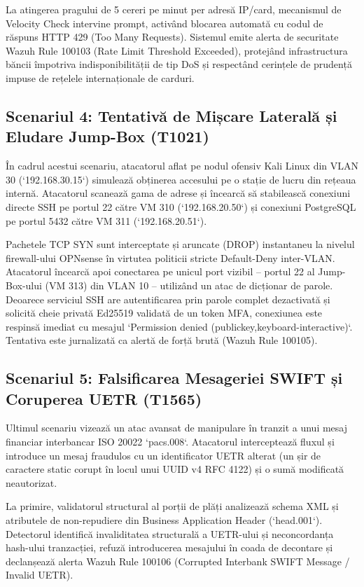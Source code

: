 La atingerea pragului de 5 cereri pe minut per adresă IP/card, mecanismul de Velocity Check intervine prompt, activând blocarea automată cu codul de răspuns HTTP 429 (Too Many Requests). Sistemul emite alerta de securitate Wazuh Rule 100103 (Rate Limit Threshold Exceeded), protejând infrastructura băncii împotriva indisponibilității de tip DoS și respectând cerințele de prudență impuse de rețelele internaționale de carduri.

\subsection{Scenariul 4: Tentativă de Mișcare Laterală și Eludare Jump-Box (T1021)}

În cadrul acestui scenariu, atacatorul aflat pe nodul ofensiv Kali Linux din VLAN 30 (`192.168.30.15`) simulează obținerea accesului pe o stație de lucru din rețeaua internă. Atacatorul scanează gama de adrese și încearcă să stabilească conexiuni directe SSH pe portul 22 către VM 310 (`192.168.20.50`) și conexiuni PostgreSQL pe portul 5432 către VM 311 (`192.168.20.51`).

Pachetele TCP SYN sunt interceptate și aruncate (DROP) instantaneu la nivelul firewall-ului OPNsense în virtutea politicii stricte Default-Deny inter-VLAN. Atacatorul încearcă apoi conectarea pe unicul port vizibil – portul 22 al Jump-Box-ului (VM 313) din VLAN 10 – utilizând un atac de dicționar de parole. Deoarece serviciul SSH are autentificarea prin parole complet dezactivată și solicită cheie privată Ed25519 validată de un token MFA, conexiunea este respinsă imediat cu mesajul `Permission denied (publickey,keyboard-interactive)`. Tentativa este jurnalizată ca alertă de forță brută (Wazuh Rule 100105).

\subsection{Scenariul 5: Falsificarea Mesageriei SWIFT și Coruperea UETR (T1565)}

Ultimul scenariu vizează un atac avansat de manipulare în tranzit a unui mesaj financiar interbancar ISO 20022 `pacs.008`. Atacatorul interceptează fluxul și introduce un mesaj fraudulos cu un identificator UETR alterat (un șir de caractere static corupt în locul unui UUID v4 RFC 4122) și o sumă modificată neautorizat.

La primire, validatorul structural al porții de plăți analizează schema XML și atributele de non-repudiere din Business Application Header (`head.001`). Detectorul identifică invaliditatea structurală a UETR-ului și neconcordanța hash-ului tranzacției, refuză introducerea mesajului în coada de decontare și declanșează alerta Wazuh Rule 100106 (Corrupted Interbank SWIFT Message / Invalid UETR).

